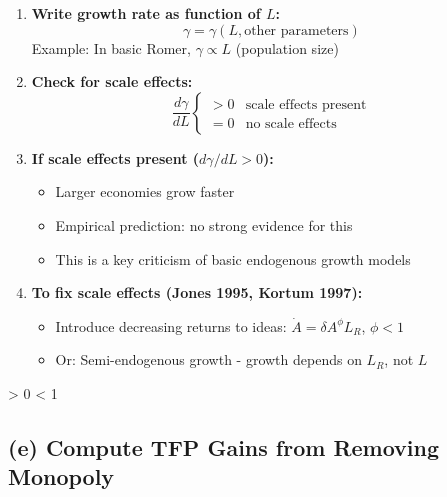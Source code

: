 \begin{enumerate}
    \item \textbf{Write growth rate as function of $L$:}
    \[
    \gamma = \gamma(L, \text{other parameters})
    \]
    Example: In basic Romer, $\gamma \propto L$ (population size)
    
    \item \textbf{Check for scale effects:}
    \[
    \frac{d\gamma}{dL} \begin{cases}
    > 0 & \text{scale effects present} \\
    = 0 & \text{no scale effects}
    \end{cases}
    \]
    
    \item \textbf{If scale effects present ($d\gamma/dL > 0$):}
    \begin{itemize}
        \item Larger economies grow faster
        \item Empirical prediction: no strong evidence for this
        \item This is a key criticism of basic endogenous growth models
    \end{itemize}
    
    \item \textbf{To fix scale effects (Jones 1995, Kortum 1997):}
    \begin{itemize}
        \item Introduce decreasing returns to ideas: $\dot{A} = \delta A^\phi L_R$, $\phi < 1$
        \item Or: Semi-endogenous growth - growth depends on $L_R$, not $L$
    \end{itemize}
\end{enumerate}

\begin{resultbox}
  > 0 \Rightarrow {}
\quad
{} \phi < 1 
\end{resultbox}

\medskip

\subsection*{(e) Compute TFP Gains from Removing Monopoly}

